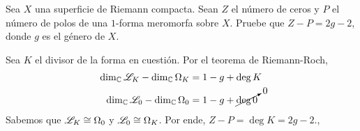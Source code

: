 \begin{exercise}
Sea $X$ una superficie de Riemann compacta. Sean $Z$ el número de ceros y $P$ el número de polos de una $1$-forma meromorfa sobre $X$. Pruebe que $Z - P = 2g - 2$, donde $g$ es el género de $X$.
\end{exercise}

\begin{solution}
Sea $K$ el divisor de la forma en cuestión. Por el teorema de Riemann-Roch,
\begin{align*}
    \dim_\mathbb C \mathscr L_K - \dim_\mathbb C \Omega_K &= 1 - g + \deg K \\
    \dim_\mathbb C \mathscr L_0 - \dim_\mathbb C \Omega_0 &= 1 - g + \cancelto 0 {\deg 0}
\end{align*}
Sabemos que $\mathscr L_K \cong \Omega_0$ y $\mathscr L_0 \cong \Omega_K$. Por ende, $Z - P = \deg K = 2g - 2$.,
\end{solution}
